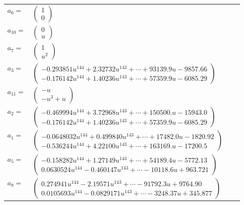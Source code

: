 \documentclass[1p]{elsarticle_modified}
\theoremstyle{definition}
\begin{document}
\begin{tabular}{m{7pt} m{180pt} m{7pt} m{180pt} }
\flushright $a_{6}=$&$\begin{pmatrix}1\\0\end{pmatrix}$ \\
\flushright $a_{10}=$&$\begin{pmatrix}0\\u\end{pmatrix}$ \\
\flushright $a_{7}=$&$\begin{pmatrix}1\\u^2\end{pmatrix}$ \\
\flushright $a_{3}=$&$\begin{pmatrix}-0.293851 u^{144}+2.32732 u^{143}+\cdots+93139.9 u-9857.66\\-0.176142 u^{144}+1.40236 u^{143}+\cdots+57359.9 u-6085.29\end{pmatrix}$ \\
\flushright $a_{11}=$&$\begin{pmatrix}- u\\- u^3+u\end{pmatrix}$ \\
\flushright $a_{2}=$&$\begin{pmatrix}-0.469994 u^{144}+3.72968 u^{143}+\cdots+150500. u-15943.0\\-0.176142 u^{144}+1.40236 u^{143}+\cdots+57359.9 u-6085.29\end{pmatrix}$ \\
\flushright $a_{1}=$&$\begin{pmatrix}-0.0648032 u^{144}+0.499840 u^{143}+\cdots+17482.0 u-1820.92\\-0.536244 u^{144}+4.22100 u^{143}+\cdots+163169. u-17200.5\end{pmatrix}$ \\
\flushright $a_{5}=$&$\begin{pmatrix}-0.158282 u^{144}+1.27149 u^{143}+\cdots+54189.4 u-5772.13\\0.0630524 u^{144}-0.460147 u^{143}+\cdots-10118.6 u+963.721\end{pmatrix}$ \\
\flushright $a_{8}=$&$\begin{pmatrix}0.274941 u^{144}-2.19571 u^{143}+\cdots-91792.3 u+9764.90\\0.0105693 u^{144}-0.0829171 u^{143}+\cdots-3248.37 u+345.877\end{pmatrix}$ \\

\end{tabular}
\end{document}
